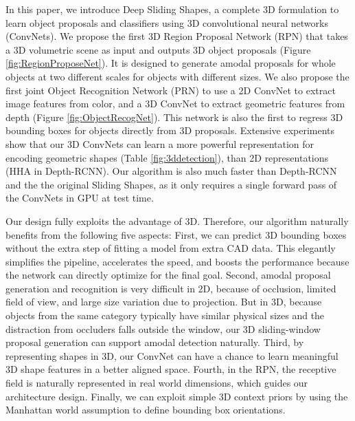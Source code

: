 \documentclass[10pt,twocolumn,letterpaper]{article}
\begin{document}
In this paper, we introduce Deep Sliding Shapes, 
a complete 3D formulation to learn object proposals and classifiers using 3D convolutional neural networks (ConvNets).
We propose the first 3D Region Proposal Network (RPN) that takes a 3D volumetric scene as input and outputs 3D object proposals (Figure \ref{fig:RegionProposeNet}).
It is designed to generate amodal proposals for whole objects at two different scales for objects with different sizes.
We also propose the first joint Object Recognition Network (PRN) to use a 2D ConvNet to extract image features from color, 
and a 3D ConvNet to extract geometric features from depth  (Figure \ref{fig:ObjectRecogNet}).
This network is also the first to regress 3D bounding boxes for objects directly from 3D proposals.
Extensive experiments show that our 3D ConvNets can learn a more powerful representation for encoding geometric shapes 
(Table \ref{fig:3ddetection}),
than 2D representations (\eg HHA in Depth-RCNN). 
Our algorithm is also much faster than Depth-RCNN and the the original Sliding Shapes, 
as it only requires a single forward pass of the ConvNets in GPU at test time.


Our design fully exploits the advantage of 3D. Therefore, our algorithm naturally benefits from the following five aspects:
First, 
we can predict 3D bounding boxes without the extra step of fitting a model from extra CAD data.
This elegantly simplifies the pipeline, accelerates the speed, and boosts the performance because the network can directly optimize for the final goal.
Second, 
amodal proposal generation and recognition is very difficult in 2D,
because of occlusion, limited field of view, and large size variation due to projection.
But in 3D, 
because objects from the same category typically have similar physical sizes and the distraction from occluders falls outside the window,
our 3D sliding-window proposal generation can support amodal detection naturally.
Third, 
by representing shapes in 3D, our ConvNet can have a chance to learn meaningful 3D shape features in a better aligned space. Fourth, in the RPN, 
the receptive field is naturally represented in real world dimensions, 
which guides our architecture design.
Finally, we can exploit simple 3D context priors by using the Manhattan world assumption to define bounding box orientations.
\end{document}

